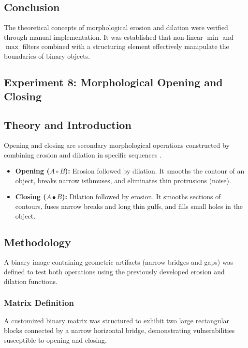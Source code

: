 \documentclass[11pt]{article}
\begin{document}
\subsection{Conclusion}
The theoretical concepts of morphological erosion and dilation were verified through manual implementation. It was established that non-linear $\min$ and $\max$ filters combined with a structuring element effectively manipulate the boundaries of binary objects.

\pagebreak
\begin{center}
    \section{Experiment 8: Morphological Opening and Closing}
\end{center}

\subsection{Theory and Introduction}
Opening and closing are secondary morphological operations constructed by combining erosion and dilation in specific sequences \cite{gonzalez2018}.
\begin{itemize}
    \item \textbf{Opening ($A \circ B$):} Erosion followed by dilation. It smooths the contour of an object, breaks narrow isthmuses, and eliminates thin protrusions (noise).
    \item \textbf{Closing ($A \bullet B$):} Dilation followed by erosion. It smooths sections of contours, fuses narrow breaks and long thin gulfs, and fills small holes in the object.
\end{itemize}

\subsection{Methodology}
A binary image containing geometric artifacts (narrow bridges and gaps) was defined to test both operations using the previously developed erosion and dilation functions.

\subsubsection{Matrix Definition}
A customized binary matrix was structured to exhibit two large rectangular blocks connected by a narrow horizontal bridge, demonstrating vulnerabilities susceptible to opening and closing.
\end{document}
